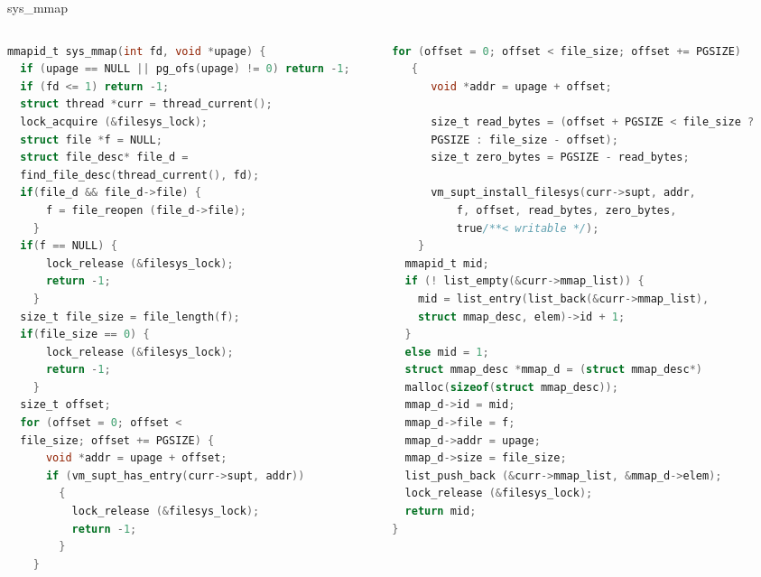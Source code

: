 \documentclass[10pt]{beamer}
\begin{document}
\begin{frame}[fragile]{sys\_mmap}
\begin{columns}
\begin{column}{0.5\textwidth}
\begin{lstlisting}[language=C]
mmapid_t sys_mmap(int fd, void *upage) {
  if (upage == NULL || pg_ofs(upage) != 0) return -1;
  if (fd <= 1) return -1; 
  struct thread *curr = thread_current();
  lock_acquire (&filesys_lock);
  struct file *f = NULL;
  struct file_desc* file_d = 
  find_file_desc(thread_current(), fd);
  if(file_d && file_d->file) {
      f = file_reopen (file_d->file);
    }
  if(f == NULL) {
      lock_release (&filesys_lock);
      return -1;
    }
  size_t file_size = file_length(f);
  if(file_size == 0) {
      lock_release (&filesys_lock);
      return -1;
    }
  size_t offset;
  for (offset = 0; offset < 
  file_size; offset += PGSIZE) {
      void *addr = upage + offset;
      if (vm_supt_has_entry(curr->supt, addr))
        {
          lock_release (&filesys_lock);
          return -1;
        }
    }
\end{lstlisting}
\end{column}
\begin{column}{0.5\textwidth}
\begin{lstlisting}[language=C]
  for (offset = 0; offset < file_size; offset += PGSIZE) 
   {
      void *addr = upage + offset;

      size_t read_bytes = (offset + PGSIZE < file_size ? 
      PGSIZE : file_size - offset);
      size_t zero_bytes = PGSIZE - read_bytes;

      vm_supt_install_filesys(curr->supt, addr,
          f, offset, read_bytes, zero_bytes, 
          true/**< writable */);
    }
  mmapid_t mid;
  if (! list_empty(&curr->mmap_list)) {
    mid = list_entry(list_back(&curr->mmap_list), 
    struct mmap_desc, elem)->id + 1;
  }
  else mid = 1;
  struct mmap_desc *mmap_d = (struct mmap_desc*) 
  malloc(sizeof(struct mmap_desc));
  mmap_d->id = mid;
  mmap_d->file = f;
  mmap_d->addr = upage;
  mmap_d->size = file_size;
  list_push_back (&curr->mmap_list, &mmap_d->elem);
  lock_release (&filesys_lock);
  return mid;
}
\end{lstlisting}
\end{column}
\end{columns}
\end{frame}
\end{document}
